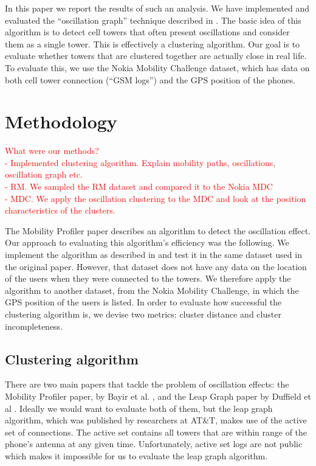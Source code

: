 \documentclass[letterpaper, 11pt, conference]{ieeeconf}
\newcommand{\xxx}[1]{\textcolor{red}{#1}}
\begin{document}
In this paper we report the results of such an analysis. We have implemented and evaluated the ``oscillation graph'' technique described in \cite{mobilityprofiler}. The basic idea of this algorithm is to detect cell towers that often present oscillations and consider them as a single tower. This is effectively a clustering algorithm. Our goal is to evaluate whether towers that are clustered together are actually close in real life. To evaluate this, we use the Nokia Mobility Challenge dataset, which has data on both cell tower connection (``GSM logs'') and the GPS position of the phones.

\section{Methodology}
\label{sec:methodology}
\xxx{What were our methods?\\- Implemented clustering algorithm. Explain mobility paths, oscillations, oscillation graph etc. \\- RM. We sampled the RM dataset and compared it to
the Nokia MDC \\- MDC. We apply the oscillation clustering to the MDC and look at the position
characteristics of the clusters.}

The Mobility Profiler paper \cite{mobilityprofiler} describes an algorithm to detect the oscillation effect. Our approach to evaluating this algorithm's efficiency was the following. We implement the algorithm as described in \cite{mobilityprofiler} and test it in the same dataset used in the original paper. However, that dataset does not have any data on the location of the users when they were connected to the towers. We therefore apply the algorithm to another dataset, from the Nokia Mobility Challenge, in which the GPS position of the users is listed. In order to evaluate how successful the clustering algorithm is, we devise two metrics: cluster distance and cluster incompleteness.

\subsection{Clustering algorithm}

There are two main papers that tackle the problem of oscillation effects: the Mobility Profiler paper, by Bayir et al. \cite{mobilityprofiler}, and the Leap Graph paper by Duffield et al \cite{LeapGraph}. Ideally we would want to evaluate both of them, but the leap graph algorithm, which was published by researchers at AT\&T, makes use of the active set of connections. The active set contains all towers that are within range of the phone's antenna at any given time. Unfortunately, active set logs are not public which makes it impossible for us to evaluate the leap graph algorithm.
\end{document}

